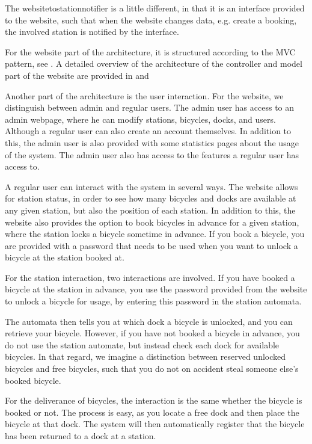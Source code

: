 The websitetostationnotifier is a little different, in that it is an interface provided to the website, such that when the website changes data, e.g. create a booking, the involved station is notified by the interface.

For the website part of the architecture, it is structured according to the MVC pattern, see .
A detailed overview of the architecture of the controller and model part of the website are provided in  and 

Another part of the architecture is the user interaction.
For the website, we distinguish between admin and regular users.
The admin user has access to an admin webpage, where he can modify stations, bicycles, docks, and users. 
Although a regular user can also create an account themselves.
In addition to this, the admin user is also provided with some statistics pages about the usage of the system.
The admin user also has access to the features a regular user has access to.

A regular user can interact with the system in several ways.
The website allows for station status, in order to see how many bicycles and docks are available at any given station, but also the position of each station.
In addition to this, the website also provides the option to book bicycles in advance for a given station, where the station locks a bicycle sometime in advance.
If you book a bicycle, you are provided with a password that needs to be used when you want to unlock a bicycle at the station booked at.

For the station interaction, two interactions are involved.
If you have booked a bicycle at the station in advance, you use the password provided from the website to unlock a bicycle for usage, by entering this password in the station automata.

The automata then tells you at which dock a bicycle is unlocked, and you can retrieve your bicycle.
However, if you have not booked a bicycle in advance, you do not use the station automate, but instead check each dock for available bicycles.
In that regard, we imagine a distinction between reserved unlocked bicycles and free bicycles, such that you do not on accident steal someone else's booked bicycle.

For the deliverance of bicycles, the interaction is the same whether the bicycle is booked or not.
The process is easy, as you locate a free dock and then place the bicycle at that dock.
The system will then automatically register that the bicycle has been returned to a dock at a station.



